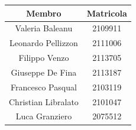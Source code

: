 \documentclass[10pt, letterpaper]{article}
\begin{document}
\begin{center}
    \begin{tabular}{|c|c|}
        \hline
        \rowcolor{lightgray} \textbf{Membro} & \textbf{Matricola} \\
        \hline
        Valeria Baleanu & 2109911 \\
        \hline
        Leonardo Pellizzon & 2111006 \\
        \hline
        Filippo Venzo & 2113705 \\
        \hline
        Giuseppe De Fina & 2113187 \\
        \hline
        Francesco Pasqual & 2103119 \\
        \hline
        Christian Libralato & 2101047 \\
        \hline
        Luca Granziero & 2075512 \\
        \hline
    \end{tabular}
\end{center}
\end{document}
